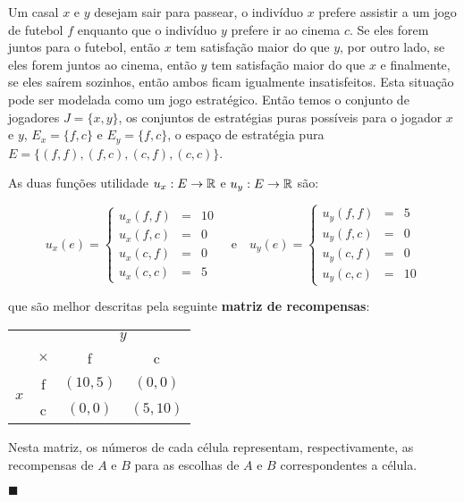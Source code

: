\begin{ex}\label{bat}
Um casal $x$ e $y$ desejam sair para passear, o indivíduo $x$ prefere assistir a um jogo de futebol $f$ enquanto que o indivíduo $y$ prefere ir ao cinema $c$. Se eles forem juntos para o futebol, então $x$ tem satisfação maior do que $y$, por outro lado, se eles forem juntos ao cinema, então $y$ tem satisfação maior do que $x$ e finalmente, se eles saírem sozinhos, então ambos ficam igualmente insatisfeitos. Esta situação pode ser modelada como um jogo estratégico. Então temos o conjunto de jogadores $J=\{x,y\}$, os conjuntos de estratégias puras possíveis para o jogador $x$ e $y$, $E_{x}=\{f,c\}$ e $E_{y}=\{f,c\}$, o espaço de estratégia pura $E=\{(f,f),(f,c),(c,f),(c,c)\}$.

As duas funções utilidade $u_{x} : E \rightarrow \mathbb{R}$ e $u_{y} : E \rightarrow \mathbb{R}$ são:

$$u_x(e)=\left\{\begin{array}{lll}u_x(f,f)&=&10\\u_x(f,c)&=&0\\u_x(c,f)&=&0\\u_x(c,c)&=&5\end{array}\right.\quad\text{e}\quad u_y(e)=\left\{\begin{array}{lll}u_y(f,f)&=&5\\u_y(f,c)&=&0\\u_y(c,f)&=&0\\u_y(c,c)&=&10\end{array}\right.$$\vspace{0.1cm}

que são melhor descritas pela seguinte \textbf{matriz de recompensas}:

\begin{center}
\begin{tabular}[H]{c|c|c|c|}
\multicolumn{2}{c}{} & \multicolumn{2}{c}{$y$} \\\cline{2-4}
& $\times$ & f & c\\\cline{2-4}
\multirow{2}{*}{$x$} & f & $(10,5)$ & $(0,0)$ \\\cline{2-4}
& c & $(0,0)$ & $(5,10)$ \\\cline{2-4}
\end{tabular}
\end{center}\vspace{1cm}
Nesta matriz, os números de cada célula representam, respectivamente, as recompensas de $A$ e $B$ para as escolhas de $A$ e $B$ correspondentes a célula. 

\hfill$\blacksquare$

\end{ex}

